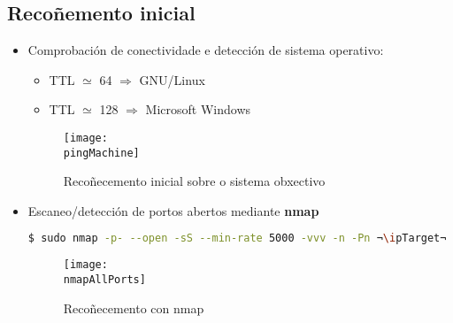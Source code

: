\documentclass[a4paper]{article}
\newcommand{\pingMachine}{ping_pentesterlab.png}
\newcommand{\nmapAllPorts}{nmap_pentesterlab_allPorts.png}
\newcommand{\ipTarget}{192.168.120.100}
\begin{document}
        \subsection{Recoñemento inicial}
        \vspace{0.2cm}
        \begin{itemize}
                \item Comprobación de conectividade e detección de sistema operativo: 
                \begin{itemize}
                        \item TTL $\simeq$ 64 $\Rightarrow$ GNU/Linux
                        \item TTL $\simeq$ 128 $\Rightarrow$ Microsoft Windows
                \end{itemize}

        \begin{figure}[h]
                \begin{center}
                        \begin{tcolorbox}[colback=blackFondoImaxes,hbox]
                                \texttt{[image: \\pingMachine]}
                        \end{tcolorbox}
                \end{center}
                \caption{Recoñecemento inicial sobre o sistema obxectivo}
        \end{figure}

        \vspace{0.2cm}

                \item Escaneo/detección de portos abertos mediante \textbf{nmap}
        \begin{lstlisting}[language=Bash, caption=nmap: Portos TCP open]
$ sudo nmap -p- --open -sS --min-rate 5000 -vvv -n -Pn ¬\ipTarget¬\end{lstlisting}
         \begin{figure}[h]
                \begin{center}
                        \begin{tcolorbox}[colback=blackFondoImaxes,hbox]
                                \centering
                                \texttt{[image: \\nmapAllPorts]}
                        \end{tcolorbox}
                \end{center}
                \caption{Recoñecemento con nmap}
        \end{figure}


\end{itemize}
\end{document}
